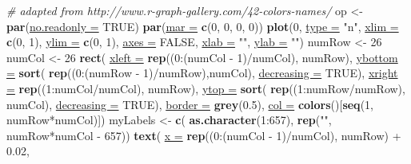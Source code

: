 \documentclass[twoside,symmetric]{book}
\newenvironment{Shaded}{}{}
\newcommand{\CommentTok}[1]{\textit{#1}}
\newcommand{\DataTypeTok}[1]{\underline{#1}}
\newcommand{\DecValTok}[1]{#1}
\newcommand{\FloatTok}[1]{#1}
\newcommand{\KeywordTok}[1]{\textbf{#1}}
\newcommand{\NormalTok}[1]{#1}
\newcommand{\OperatorTok}[1]{#1}
\newcommand{\OtherTok}[1]{#1}
\newcommand{\StringTok}[1]{#1}
\begin{document}
\begin{Shaded}
\begin{Highlighting}[]
\CommentTok{# adapted from http://www.r-graph-gallery.com/42-colors-names/}
\NormalTok{op <-}\StringTok{ }\KeywordTok{par}\NormalTok{(}\DataTypeTok{no.readonly =} \OtherTok{TRUE}\NormalTok{)}
\KeywordTok{par}\NormalTok{(}\DataTypeTok{mar =} \KeywordTok{c}\NormalTok{(}\DecValTok{0}\NormalTok{, }\DecValTok{0}\NormalTok{, }\DecValTok{0}\NormalTok{, }\DecValTok{0}\NormalTok{))}
\KeywordTok{plot}\NormalTok{(}\DecValTok{0}\NormalTok{, }\DataTypeTok{type =} \StringTok{"n"}\NormalTok{, }\DataTypeTok{xlim =} \KeywordTok{c}\NormalTok{(}\DecValTok{0}\NormalTok{, }\DecValTok{1}\NormalTok{), }\DataTypeTok{ylim =} \KeywordTok{c}\NormalTok{(}\DecValTok{0}\NormalTok{, }\DecValTok{1}\NormalTok{), }
  \DataTypeTok{axes =} \OtherTok{FALSE}\NormalTok{, }\DataTypeTok{xlab =} \StringTok{""}\NormalTok{, }\DataTypeTok{ylab =} \StringTok{""}\NormalTok{)}
\NormalTok{numRow <-}\StringTok{ }\DecValTok{26}
\NormalTok{numCol <-}\StringTok{ }\DecValTok{26}
\KeywordTok{rect}\NormalTok{(}
  \DataTypeTok{xleft =} \KeywordTok{rep}\NormalTok{((}\DecValTok{0}\OperatorTok{:}\NormalTok{(numCol }\OperatorTok{-}\StringTok{ }\DecValTok{1}\NormalTok{)}\OperatorTok{/}\NormalTok{numCol), numRow),  }
  \DataTypeTok{ybottom =} \KeywordTok{sort}\NormalTok{(}
    \KeywordTok{rep}\NormalTok{((}\DecValTok{0}\OperatorTok{:}\NormalTok{(numRow }\OperatorTok{-}\StringTok{ }\DecValTok{1}\NormalTok{)}\OperatorTok{/}\NormalTok{numRow),numCol), }
    \DataTypeTok{decreasing =} \OtherTok{TRUE}\NormalTok{),}
  \DataTypeTok{xright =} \KeywordTok{rep}\NormalTok{((}\DecValTok{1}\OperatorTok{:}\NormalTok{numCol}\OperatorTok{/}\NormalTok{numCol), numRow),}
  \DataTypeTok{ytop =} \KeywordTok{sort}\NormalTok{(}
    \KeywordTok{rep}\NormalTok{((}\DecValTok{1}\OperatorTok{:}\NormalTok{numRow}\OperatorTok{/}\NormalTok{numRow), numCol), }
    \DataTypeTok{decreasing =} \OtherTok{TRUE}\NormalTok{),}
  \DataTypeTok{border =} \KeywordTok{grey}\NormalTok{(}\FloatTok{0.5}\NormalTok{), }
  \DataTypeTok{col =} \KeywordTok{colors}\NormalTok{()[}\KeywordTok{seq}\NormalTok{(}\DecValTok{1}\NormalTok{, numRow}\OperatorTok{*}\NormalTok{numCol)])}
\NormalTok{myLabels <-}\StringTok{ }\KeywordTok{c}\NormalTok{(}
  \KeywordTok{as.character}\NormalTok{(}\DecValTok{1}\OperatorTok{:}\DecValTok{657}\NormalTok{), }\KeywordTok{rep}\NormalTok{(}\StringTok{""}\NormalTok{, numRow}\OperatorTok{*}\NormalTok{numCol }\OperatorTok{-}\StringTok{ }\DecValTok{657}\NormalTok{))}
\KeywordTok{text}\NormalTok{(}
  \DataTypeTok{x =} \KeywordTok{rep}\NormalTok{((}\DecValTok{0}\OperatorTok{:}\NormalTok{(numCol }\OperatorTok{-}\StringTok{ }\DecValTok{1}\NormalTok{)}\OperatorTok{/}\NormalTok{numCol), numRow) }\OperatorTok{+}\StringTok{ }\FloatTok{0.02}\NormalTok{,}

\end{Highlighting}
\end{Shaded}
\end{document}
